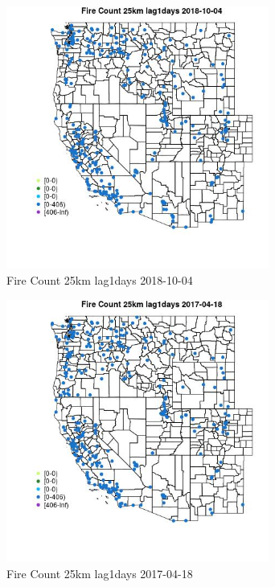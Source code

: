 \begin{figure} 
\centering  
\includegraphics[width=0.77\textwidth]{Code_Outputs/Report_ML_input_PM25_Step4_part_f_de_duplicated_aves_prioritize_24hr_obswNAs_MapObsFire_Count_25km_lag1days2018-10-04.jpg} 
\caption{\label{fig:Report_ML_input_PM25_Step4_part_f_de_duplicated_aves_prioritize_24hr_obswNAsMapObsFire_Count_25km_lag1days2018-10-04}Fire Count 25km lag1days 2018-10-04} 
\end{figure} 
 

\begin{figure} 
\centering  
\includegraphics[width=0.77\textwidth]{Code_Outputs/Report_ML_input_PM25_Step4_part_f_de_duplicated_aves_prioritize_24hr_obswNAs_MapObsFire_Count_25km_lag1days2017-04-18.jpg} 
\caption{\label{fig:Report_ML_input_PM25_Step4_part_f_de_duplicated_aves_prioritize_24hr_obswNAsMapObsFire_Count_25km_lag1days2017-04-18}Fire Count 25km lag1days 2017-04-18} 
\end{figure} 
 

